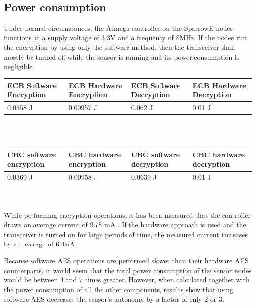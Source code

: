 \subsection{Power consumption}

Under normal circumstances, the Atmega controller on the SparrowE nodes functions at a 
supply voltage of 3.3V and a frequency of 8MHz. If the nodes run the encryption by using 
only the software method, then the transceiver shall mostly be turned off while the sensor is 
running and its power consumption is negligible.\\


\begin{tabular}{ | p{1.75cm} | p{1.75cm} | p{1.75cm} | p{1.75cm} |}
    \hline
    ECB Software Encryption & ECB Hardware Encryption & ECB Software Decryption & ECB Hardware Decryption \\ \hline
    0.0358 J & 0.00957 J & 0.062 J & 0.01 J \\ \hline
\end{tabular}\\\\


\begin{tabular}{ | p{1.75cm} | p{1.75cm} | p{1.75cm} | p{1.75cm} |}
    \hline
    CBC software encryption & CBC hardware encryption & CBC software decryption & CBC hardware decryption \\ \hline
    0.0369 J & 0.00958 J & 0.0639 J & 0.01 J \\ \hline
\end{tabular}\\\\



While performing encryption operations, it has been measured that the controller draws an average current 
of 9.78 mA . If the hardware approach is used and the transceiver is turned on for large periods of
time, the measured current increases by an average of 610uA.

Because software AES operations are performed slower than their hardware AES counterparts, 
it would seem that the total power consumption of the sensor nodes would be between 4 and 7 times greater.
However, when calculated together with the power consumption of all the other components, 
results show that using software AES decreases the sensor's autonomy by a factor of only 
2 or 3. 

